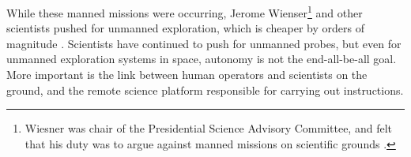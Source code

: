  While these manned missions were occurring, Jerome
 Wienser\footnote{Wiesner was chair of the Presidential Science
   Advisory Committee, and felt that his duty was to argue against
   manned missions on scientific grounds \cite[Chapter 2]{Levine}.}
and other scientists pushed for unmanned exploration, which is
cheaper by orders of magnitude \cite[p. 66]{coxMurray}. 
Scientists have continued to push for unmanned probes, but even for
unmanned exploration systems in space, autonomy is not the
end-all-be-all goal. More important is the link between human
operators and scientists on the ground, and the remote science
platform responsible for carrying out instructions. 

